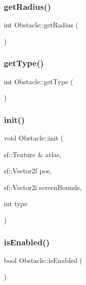 \mbox{\label{class_obstacle_af618239790edb9fc94a984f8bb281c3e}} 
\subsubsection{\texorpdfstring{get\+Radius()}{getRadius()}}
{\footnotesize\ttfamily int Obstacle\+::get\+Radius (\begin{DoxyParamCaption}{ }\end{DoxyParamCaption})}

\mbox{\label{class_obstacle_ad28c6a458187a5f5ec68c8cc3c425114}} 
\subsubsection{\texorpdfstring{get\+Type()}{getType()}}
{\footnotesize\ttfamily int Obstacle\+::get\+Type (\begin{DoxyParamCaption}{ }\end{DoxyParamCaption})}

\mbox{\label{class_obstacle_a360ec5da9397222a1699c6c6cd8bd5c4}} 
\subsubsection{\texorpdfstring{init()}{init()}}
{\footnotesize\ttfamily void Obstacle\+::init (\begin{DoxyParamCaption}\item[{sf\+::\+Texture \&}]{atlas,  }\item[{sf\+::\+Vector2f}]{pos,  }\item[{sf\+::\+Vector2i}]{screen\+Bounds,  }\item[{int}]{type }\end{DoxyParamCaption})}

\mbox{\label{class_obstacle_a3e5e80b8d4f5e46636bd5fa960621270}} 
\subsubsection{\texorpdfstring{is\+Enabled()}{isEnabled()}}
{\footnotesize\ttfamily bool Obstacle\+::is\+Enabled (\begin{DoxyParamCaption}{ }\end{DoxyParamCaption})}

